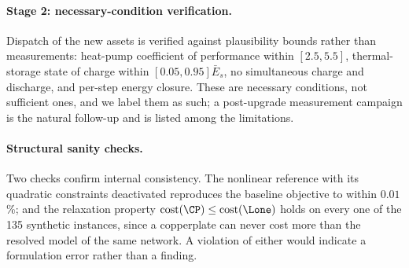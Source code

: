 \paragraph{Stage 2: necessary-condition verification.}
Dispatch of the new assets is verified against plausibility bounds rather than
measurements: heat-pump coefficient of performance within $[2.5, 5.5]$, thermal-storage
state of charge within $[0.05, 0.95]\bar{E}_s$, no simultaneous charge and discharge, and
per-step energy closure. These are necessary conditions, not sufficient ones, and we label
them as such; a post-upgrade measurement campaign is the natural follow-up and is listed
among the limitations.

\paragraph{Structural sanity checks.}
Two checks confirm internal consistency. The nonlinear reference with its quadratic
constraints deactivated reproduces the baseline objective to within $0.01$\,\%; and the
relaxation property $\mathrm{cost}(\CP) \le \mathrm{cost}(\Lone)$ holds on every one of the
135 synthetic instances, since a copperplate can never cost more than the resolved model of
the same network. A violation of either would indicate a formulation error rather than a
finding.
